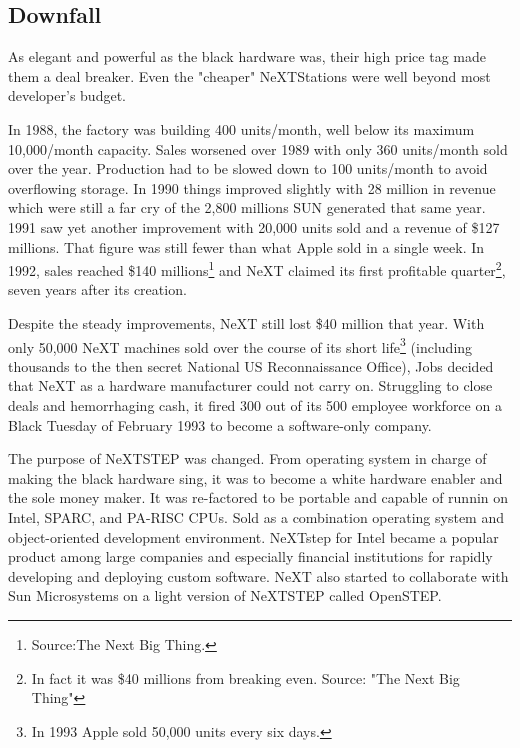 \subsection{Downfall}
As elegant and powerful as the black hardware was, their high price tag made them a deal breaker. Even the "cheaper" NeXTStations were well beyond most developer's budget.\\
\par
 In 1988, the factory was building 400 units/month, well below its maximum 10,000/month capacity. Sales worsened over 1989 with only 360 units/month sold over the year. Production had to be slowed down to 100 units/month to avoid overflowing storage. In 1990 things improved slightly with 28 million in revenue which were still a far cry of the 2,800 millions SUN generated that same year. 1991 saw yet another improvement with 20,000 units sold and a revenue of \$127 millions. That figure was still fewer than what Apple sold in a single week. In 1992, sales reached \$140 millions\footnote{Source:The Next Big Thing.} and NeXT claimed its first profitable quarter\footnote{In fact it was \$40 millions from breaking even. Source: "The Next Big Thing"}, seven years after its creation.\\
\par
Despite the steady improvements, NeXT still lost \$40 million that year. With only 50,000 NeXT machines sold over the course of its short life\footnote{In 1993 Apple sold 50,000 units every six days.} (including thousands to the then secret National US Reconnaissance Office), Jobs decided that NeXT as a hardware manufacturer could not carry on. Struggling to close deals and hemorrhaging cash, it fired 300 out of its 500 employee workforce on a Black Tuesday of February 1993 to become a software-only company.\\
\par
 The purpose of NeXTSTEP was changed. From operating system in charge of making the black hardware sing, it was to become a white hardware enabler and the sole money maker. It was re-factored to be portable and capable of runnin on Intel, SPARC, and PA-RISC CPUs. Sold as a combination operating system and object-oriented development environment. NeXTstep for Intel became a popular product among large companies and especially financial institutions for rapidly developing and deploying custom software. NeXT also started to collaborate with Sun Microsystems on a light version of NeXTSTEP called OpenSTEP.\\

